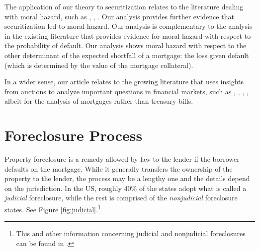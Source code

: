 \documentclass[11pt,twopage]{article}
\begin{document}


The application of our theory to securitization relates to the
literature dealing with moral hazard, such as \cite{mian2009consequences}, \cite{keys2008did},
\cite{tirole2011illiquidity}. Our analysis provides
further evidence that securitization led to moral hazard. Our analysis
is complementary to the analysis in the existing literature that
provides evidence for moral hazard with respect to the probability of
default. Our analysis shows moral hazard with respect to the other
determinant of the expected shortfall of a mortgage: the loss given
default (which is determined by the value of the mortgage collateral).

In a wider sense, our article relates to the growing literature that
uses insights from auctions to analyze important questions in
financial markets, such as \cite{heller1998auctions},
\cite{hortacsu2010mechanism}, \cite{cassola20132007},
\cite{zulehner2013competition}, albeit for the analysis of
mortgages rather than treasury bills.


\section{Foreclosure Process}
Property foreclosure is a remedy allowed by law to the lender if the
borrower defaults on the mortgage. While it generally transfers the
ownership of the property to the lender, the process may be a lengthy
one and the details depend on the jurisdiction. In the US, roughly
$40\%$ of the states adopt what is called a \emph{judicial}
foreclosure, while the rest is comprised of the \emph{nonjudicial}
foreclosure states. See Figure \ref{fig:judicial}.\footnote{This and
  other information concerning judicial and nonjudicial foreclosures
  can be found in \cite{nelson2004reforming}.}
\end{document}
